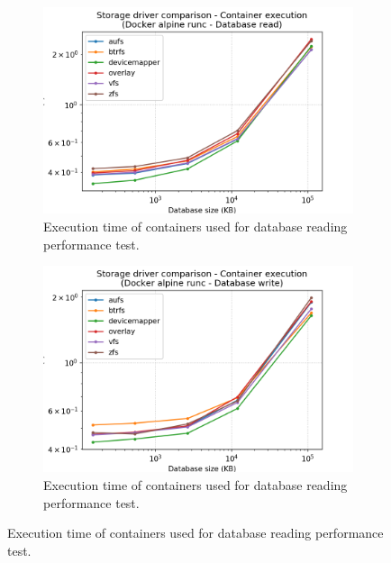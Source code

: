 \begin{figure}[h!]
    \begin{subfigure}{.5\textwidth}
      \centering
      \includegraphics[width=\linewidth]{images/storage-driver/storage-driver-execution-Docker-alpine-runc---Database-read.png}
      \caption{Execution time of containers used for database reading performance test.}
      \label{fig:storage-driver:db-read-exec}
    \end{subfigure}
    \begin{subfigure}{.5\textwidth}
      \centering
      \includegraphics[width=\linewidth]{images/storage-driver/storage-driver-execution-Docker-alpine-runc---Database-write.png}
      \caption{Execution time of containers used for database reading performance test.}
      \label{fig:storage-driver:db-write-exec}
    \end{subfigure}
    

\end{figure}
